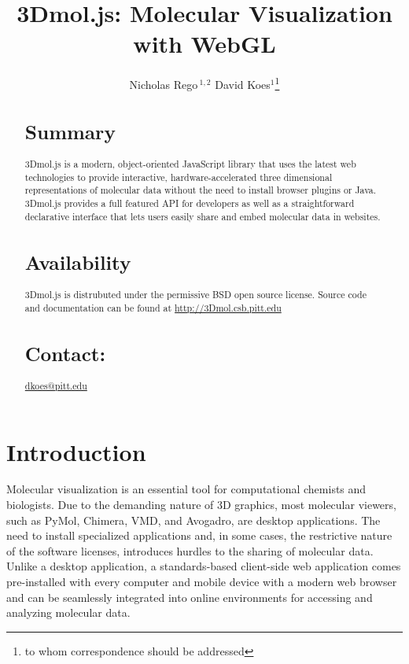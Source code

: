 \documentclass[]{bioinfo}
\begin{document}

\title[3Dmol.js: Molecular Visualization with WebGL]{3Dmol.js: Molecular Visualization with WebGL}
\author[Rego and Koes]{Nicholas Rego\,$^{1,2}$ David Koes$^{1}$\footnote{to whom correspondence should be addressed}}
\address{$^{1}$Department of Computational and Systems Biology, University of Pittsburgh, Pittsburgh, PA 15260\\
$^{2}$Department of Biochemistry and Molecular Biophysics, University of Pennsylvania, Philadelphia, PA 19104}



\maketitle
\begin{abstract}
\section{Summary} 3Dmol.js is a modern, object-oriented JavaScript library that uses the latest web technologies
to provide interactive, hardware-accelerated three dimensional representations of molecular data without the
need to install browser plugins or Java.  3Dmol.js provides a full featured API for developers as well
as a straightforward declarative interface that lets users easily share and embed molecular data in websites.
\section{Availability} 3Dmol.js is distrubuted under the permissive BSD open source license.
Source code and documentation can be found at \url{http://3Dmol.csb.pitt.edu}
\section{Contact:} \href{dkoes@pitt.edu}{dkoes@pitt.edu}
\end{abstract}

\section{Introduction}
Molecular visualization is an essential tool for computational chemists and biologists. Due to the demanding nature of 3D graphics, most molecular viewers, such as PyMol\cite{delano2002pymol}, Chimera\cite{pettersen2004ucsf}, VMD\cite{humphrey1996vmd}, and Avogadro\cite{hanwell2012avogadro}, are desktop applications.  The need to install specialized applications and, in some cases, the restrictive nature of the software licenses, introduces hurdles to the sharing of molecular data.  Unlike a desktop application, a standards-based client-side web application comes pre-installed with every computer and mobile device with a modern web browser and can be seamlessly integrated into online environments for accessing and analyzing molecular data.
\end{document}
